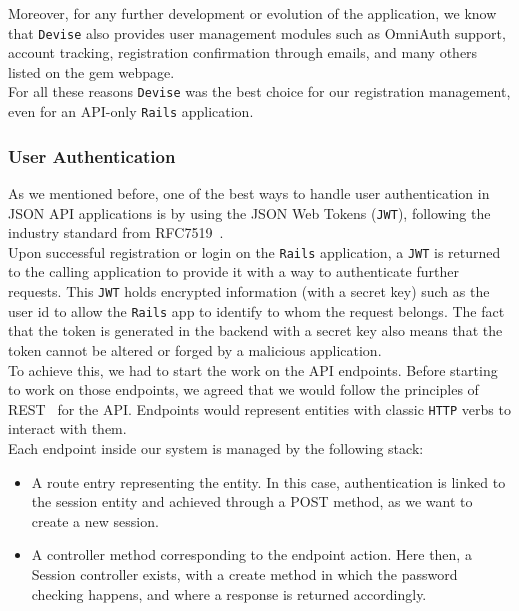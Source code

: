 \documentclass{eplmastersthesis}
\begin{document}
          Moreover, for any further development or evolution of the application,
          we know that \texttt{Devise} also provides user management modules such as
          OmniAuth support, account tracking, registration confirmation
          through emails, and many others listed on the gem webpage.\\

          For all these reasons \texttt{Devise} was the best choice for our registration management,
          even for an API-only \texttt{Rails} application.

        \subsubsection{User Authentication}

          As we mentioned before, one of the best ways to handle user
          authentication in JSON API applications is by using the JSON Web
          Tokens (\texttt{JWT}), following the industry standard from RFC7519~\cite{rfc7519}.\\

          Upon successful registration or login on the \texttt{Rails} application, a
          \texttt{JWT} is returned to the calling application to provide it with a way
          to authenticate further requests. This \texttt{JWT} holds encrypted
          information (with a secret key) such as the user id to allow the \texttt{Rails}
          app to identify to whom the request belongs. The fact that the token
          is generated in the backend with a secret key also means that the
          token cannot be altered or forged by a malicious application.\\

          To achieve this, we had to start the work on the API endpoints.
          Before starting to work on those endpoints, we agreed that we would
          follow the principles of REST~\cite{rest} for the API. Endpoints would
          represent entities with classic \texttt{HTTP} verbs to interact with them.\\

          Each endpoint inside our system is managed by the following stack:

          \begin{itemize}
            \item A route entry representing the entity. In this case,
            authentication is linked to the session entity and achieved through
            a POST method, as we want to create a new session.
            \item A controller method corresponding to the endpoint action.
            Here then, a Session controller exists, with a create method in
            which the password checking happens, and where a response is
            returned accordingly.
          \end{itemize}
\end{document}
